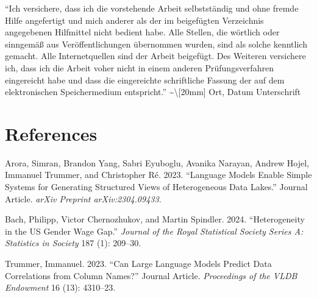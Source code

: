 \documentclass[
  11pt,
]{report}
\newlength{\cslhangindent}
\newenvironment{CSLReferences}[2] %
 {\begin{list}{}{%
  \setlength{\itemindent}{0pt}
  \setlength{\leftmargin}{0pt}
  \setlength{\parsep}{0pt}
  \ifodd #1
   \setlength{\leftmargin}{\cslhangindent}
   \setlength{\itemindent}{-1\cslhangindent}
  \fi
  \setlength{\itemsep}{#2\baselineskip}}}
 {\end{list}}
\begin{document}
``Ich versichere, dass ich die vorstehende Arbeit selbstständig und ohne
fremde Hilfe angefertigt und mich anderer als der im beigefügten
Verzeichnis angegebenen Hilfmittel nicht bedient habe. Alle Stellen, die
wörtlich oder sinngemäß aus Veröffentlichungen übernommen wurden, sind
als solche kenntlich gemacht. Alle Internetquellen sind der Arbeit
beigefügt. Des Weiteren versichere ich, dass ich die Arbeit voher nicht
in einem anderen Prüfungsverfahren eingereicht habe und dass die
eingereichte schriftliche Fassung der auf dem elektronischen
Speichermedium entspricht.'' \textasciitilde\textbackslash{[}20mm{]}
Ort, Datum\hspace{4cm} Unterschrift

\chapter*{References}\label{references}

\label{refs}
\begin{CSLReferences}{1}{0}
Arora, Simran, Brandon Yang, Sabri Eyuboglu, Avanika Narayan, Andrew
Hojel, Immanuel Trummer, and Christopher Ré. 2023. {``Language Models
Enable Simple Systems for Generating Structured Views of Heterogeneous
Data Lakes.''} Journal Article. \emph{arXiv Preprint arXiv:2304.09433}.

Bach, Philipp, Victor Chernozhukov, and Martin Spindler. 2024.
{``Heterogeneity in the US Gender Wage Gap.''} \emph{Journal of the
Royal Statistical Society Series A: Statistics in Society} 187 (1):
209--30.

Trummer, Immanuel. 2023. {``Can Large Language Models Predict Data
Correlations from Column Names?''} Journal Article. \emph{Proceedings of
the VLDB Endowment} 16 (13): 4310--23.

\end{CSLReferences}
\end{document}
